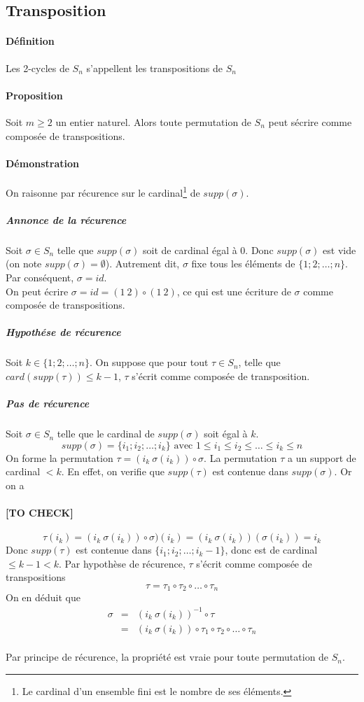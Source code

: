 %
\subsection{Transposition}
%
\paragraph{Définition} Les 2-cycles de $S_n$ s'appellent les transpositions de $S_n$

\paragraph{Proposition} Soit $m \geq 2$ un entier naturel. Alors toute permutation de $S_n$ peut sécrire comme composée de transpositions.

\paragraph{Démonstration}  On raisonne par récurence sur le cardinal\footnote{Le cardinal d'un ensemble fini est le nombre de ses éléments.} de $supp(\sigma)$.
\subparagraph{Annonce de la récurence} Soit $\sigma \in S_n$ telle que $supp(\sigma)$ soit de cardinal égal à $0$. Donc $supp(\sigma)$ est vide (on note $supp(\sigma) = \emptyset$). Autrement dit, $\sigma$ fixe tous les éléments de $\{1; 2; \ldots; n\}$. Par conséquent, $\sigma = id$. \\
On peut écrire $\sigma = id = (1 ~ 2)\circ(1 ~ 2)$, ce qui est une écriture de $\sigma$ comme composée de transpositions.

\subparagraph{Hypothése de récurence} Soit $k \in \{1; 2; \ldots; n\}$. On suppose que pour tout $\tau \in S_n$, telle que $card(supp(\tau)) \leq k-1$, $\tau$ s'écrit comme composée de transposition.

\subparagraph{Pas de récurence} Soit $\sigma \in S_n$ telle que le cardinal de $supp(\sigma)$ soit égal à $k$.
$$supp(\sigma) = \{i_1; i_2; \ldots; i_k\} \text{ avec } 1 \leq i_1 \leq i_2 \leq \ldots \leq i_k \leq n$$
On forme la permutation $\tau = (i_k ~ \sigma(i_k)) \circ \sigma$. La permutation $\tau$ a un support de cardinal $< k$. En effet, on verifie que $supp(\tau)$ est contenue dans $supp(\sigma)$. Or on a
\paragraph{[TO CHECK]}
$$\tau(i_k) = (i_k ~ \sigma(i_k)) \circ \sigma) (i_k) = (i_k ~ \sigma(i_k))(\sigma(i_k)) = i_k$$
Donc $supp(\tau)$ est contenue dans $\{i_1; i_2; \ldots; i_k-1\}$, donc est de cardinal $\leq k-1 < k$. Par hypothèse de récurence, $\tau$ s'écrit comme composée de transpositions
$$\tau = \tau_1 \circ \tau_2 \circ \ldots \circ \tau_n$$
On en déduit que 
\begin{eqnarray*}
  \sigma &=& (i_k ~ \sigma(i_k))^{-1} \circ \tau \\
    &=& (i_k ~ \sigma(i_k)) \circ \tau_1 \circ \tau_2 \circ \ldots \circ \tau_n
\end{eqnarray*}
\\
Par principe de récurence, la propriété est vraie pour toute permutation de $S_n$.

